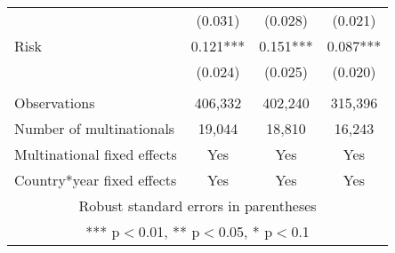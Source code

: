 \begin{tabular}{lccc}
 & (0.031) & (0.028) & (0.021) \\
Risk & 0.121*** & 0.151*** & 0.087*** \\
 & (0.024) & (0.025) & (0.020) \\
 &  &  &  \\
Observations & 406,332 & 402,240 & 315,396 \\
Number of multinationals & 19,044 & 18,810 & 16,243 \\
Multinational fixed effects & Yes & Yes & Yes \\
 Country*year fixed effects & Yes & Yes & Yes \\ \hline
\multicolumn{4}{c}{ Robust standard errors in parentheses} \\
\multicolumn{4}{c}{ *** p$<$0.01, ** p$<$0.05, * p$<$0.1} \\
\end{tabular}
